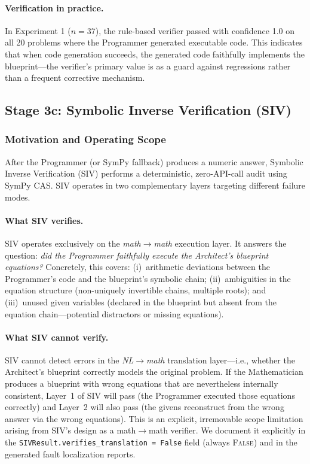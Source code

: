 \documentclass[11pt,a4paper]{article}
\begin{document}
\paragraph{Verification in practice.}
In Experiment 1 ($n=37$), the rule-based verifier passed with confidence 1.0 on all 20 problems where the Programmer generated executable code.
This indicates that when code generation succeeds, the generated code faithfully implements the blueprint---the verifier's primary value is as a guard against regressions rather than a frequent corrective mechanism.
\subsection{Stage 3c: Symbolic Inverse Verification (SIV)}
\label{sec:siv}
\subsubsection{Motivation and Operating Scope}

After the Programmer (or SymPy fallback) produces a numeric answer, Symbolic Inverse Verification (SIV) performs a deterministic, zero-API-call audit using SymPy CAS.
SIV operates in two complementary layers targeting different failure modes.

\paragraph{What SIV verifies.}
SIV operates exclusively on the \emph{math$\to$math} execution layer.
It answers the question: \emph{did the Programmer faithfully execute the Architect's blueprint equations?}
Concretely, this covers: (i)~arithmetic deviations between the Programmer's code and the blueprint's symbolic chain; (ii)~ambiguities in the equation structure (non-uniquely invertible chains, multiple roots); and (iii)~unused given variables (declared in the blueprint but absent from the equation chain---potential distractors or missing equations).

\paragraph{What SIV cannot verify.}
SIV cannot detect errors in the \emph{NL$\to$math} translation layer---i.e., whether the Architect's blueprint correctly models the original problem.
If the Mathematician produces a blueprint with wrong equations that are nevertheless internally consistent, Layer~1 of SIV will pass (the Programmer executed those equations correctly) and Layer~2 will also pass (the givens reconstruct from the wrong answer via the wrong equations).
This is an explicit, irremovable scope limitation arising from SIV's design as a math$\to$math verifier.
We document it explicitly in the \texttt{SIVResult.verifies\_translation = False} field (always \textsc{False}) and in the generated fault localization reports.
\end{document}

